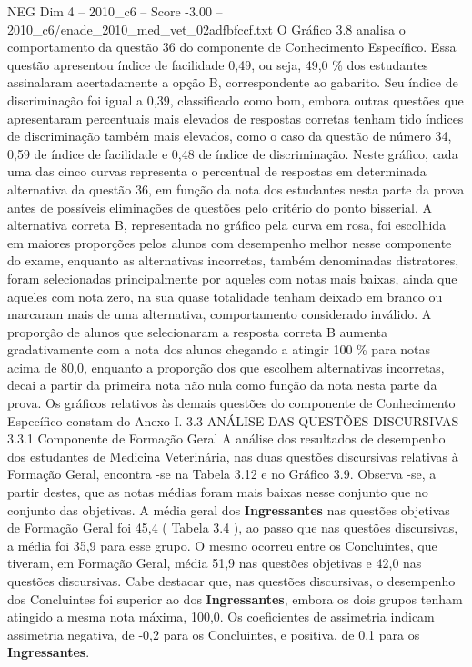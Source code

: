 \begin{textsample}{NEG Dim 4 – 2010\_c6 – Score -3.00 – 2010\_c6/enade\_2010\_med\_vet\_02adfbfccf.txt}
O Gráfico 3.8 analisa o comportamento da questão 36 do componente de Conhecimento Específico.
Essa questão apresentou índice de facilidade 0,49, ou seja, 49,0 \% dos estudantes assinalaram acertadamente a opção B, correspondente ao gabarito.
Seu índice de discriminação foi igual a 0,39, classificado como bom, embora outras questões que apresentaram percentuais mais elevados de respostas corretas tenham tido índices de discriminação também mais elevados, como o caso da questão de número 34, 0,59 de índice de facilidade e 0,48 de índice de discriminação.
Neste gráfico, cada uma das cinco curvas representa o percentual de respostas em determinada alternativa da questão 36, em função da nota dos estudantes nesta parte da prova antes de possíveis eliminações de questões pelo critério do ponto bisserial.
A alternativa correta B, representada no gráfico pela curva em rosa, foi escolhida em maiores proporções pelos alunos com desempenho melhor nesse componente do exame, enquanto as alternativas incorretas, também denominadas distratores, foram selecionadas principalmente por aqueles com notas mais baixas, ainda que aqueles com nota zero, na sua quase totalidade tenham deixado em branco ou marcaram mais de uma alternativa, comportamento considerado inválido.
A proporção de alunos que selecionaram a resposta correta B aumenta gradativamente com a nota dos alunos chegando a atingir 100 \% para notas acima de 80,0, enquanto a proporção dos que escolhem alternativas incorretas, decai a partir da primeira nota não nula como função da nota nesta parte da prova.
Os gráficos relativos às demais questões do componente de Conhecimento Específico constam do Anexo I. 3.3 ANÁLISE DAS QUESTÕES DISCURSIVAS 3.3.1 Componente de Formação Geral A análise dos resultados de desempenho dos estudantes de Medicina Veterinária, nas duas questões discursivas relativas à Formação Geral, encontra -se na Tabela 3.12 e no Gráfico 3.9.
Observa -se, a partir destes, que as notas médias foram mais baixas nesse conjunto que no conjunto das objetivas.
A média geral dos \textbf{Ingressantes} nas questões objetivas de Formação Geral foi 45,4 ( Tabela 3.4 ), ao passo que nas questões discursivas, a média foi 35,9 para esse grupo.
O mesmo ocorreu entre os Concluintes, que tiveram, em Formação Geral, média 51,9 nas questões objetivas e 42,0 nas questões discursivas.
Cabe destacar que, nas questões discursivas, o desempenho dos Concluintes foi superior ao dos \textbf{Ingressantes}, embora os dois grupos tenham atingido a mesma nota máxima, 100,0.
Os coeficientes de assimetria indicam assimetria negativa, de -0,2 para os Concluintes, e positiva, de 0,1 para os \textbf{Ingressantes}.

\end{textsample}
